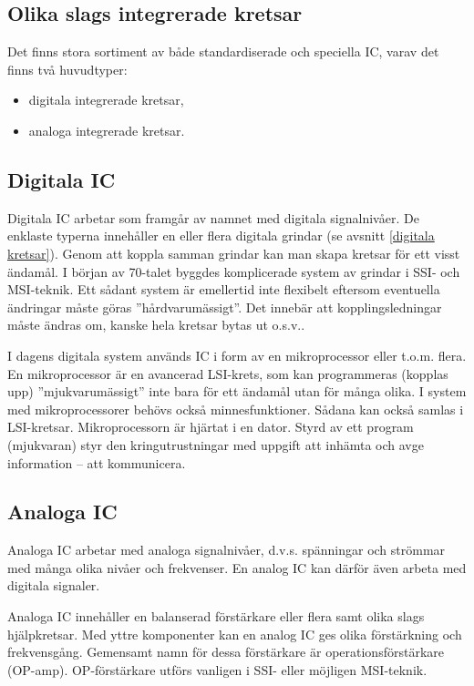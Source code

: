 \subsection{Olika slags integrerade kretsar}

Det finns stora sortiment av både standardiserade och speciella IC, varav det
finns två huvudtyper:
\begin{itemize}
\item digitala integrerade kretsar,
\item analoga integrerade kretsar.
\end{itemize}

\subsection{Digitala IC}

Digitala IC arbetar som framgår av namnet med digitala signalnivåer. De enklaste
typerna innehåller en eller flera digitala grindar (se avsnitt \ref{digitala kretsar}). Genom att
koppla samman grindar kan man skapa kretsar för ett visst ändamål. I början av
70-talet byggdes komplicerade system av grindar i SSI- och MSI-teknik. Ett
sådant system är emellertid inte flexibelt eftersom eventuella ändringar måste
göras ''hårdvarumässigt''. Det innebär att kopplingsledningar måste ändras om,
kanske hela kretsar bytas ut o.s.v..

I dagens digitala system används IC i form av en mikroprocessor eller t.o.m.
flera. En mikroprocessor är en avancerad LSI-krets, som kan programmeras
(kopplas upp) ''mjukvarumässigt'' inte bara för ett ändamål utan för många
olika. I system med mikroprocessorer behövs också minnesfunktioner. Sådana kan
också samlas i LSI-kretsar. Mikroprocessorn är hjärtat i en dator. Styrd av ett
program (mjukvaran) styr den kringutrustningar med uppgift att inhämta och avge
information -- att kommunicera.

\subsection{Analoga IC}

Analoga IC arbetar med analoga signalnivåer, d.v.s. spänningar och strömmar med
många olika nivåer och frekvenser. En analog IC kan därför även arbeta med
digitala signaler.

Analoga IC innehåller en balanserad förstärkare eller flera samt olika slags
hjälpkretsar. Med yttre komponenter kan en analog IC ges olika förstärkning och
frekvensgång. Gemensamt namn för dessa förstärkare är operationsförstärkare
(OP-amp). OP-förstärkare utförs vanligen i SSI- eller möjligen MSI-teknik.

